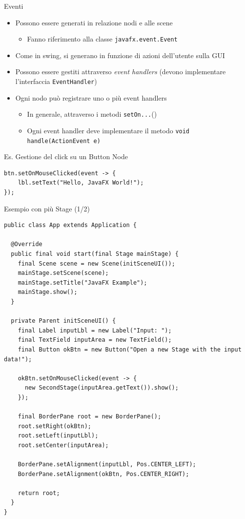 \documentclass[xcolor=dvipsnames,presentation]{beamer}
\begin{document}
\begin{frame}[fragile]{Eventi}
\begin{itemize}\itemsep10pt
\item Possono essere generati in relazione nodi e alle scene
\begin{itemize}
\item Fanno riferimento alla classe \texttt{javafx.event.Event}
\end{itemize}
\item Come in swing, si generano in funzione di azioni dell'utente sulla GUI
\item Possono essere gestiti attraverso \emph{event handlers} (devono implementare l'interfaccia \texttt{EventHandler})
\item Ogni nodo può registrare uno o più event handlers
\begin{itemize}
\item In generale, attraverso i metodi \texttt{setOn...}()
\item Ogni event handler deve implementare il metodo \texttt{void handle(ActionEvent e)}
\end{itemize}
\end{itemize}

\begin{block}{Es. Gestione del click su un Button Node}
\begin{lstlisting}
btn.setOnMouseClicked(event -> {
    lbl.setText("Hello, JavaFX World!");
});
\end{lstlisting}
\end{block}
\end{frame}

\begin{frame}[fragile]{Esempio con più Stage (1/2)}
\begin{lstlisting}[basicstyle=\tiny\ttfamily]
public class App extends Application {

  @Override
  public final void start(final Stage mainStage) {
    final Scene scene = new Scene(initSceneUI());
    mainStage.setScene(scene);
    mainStage.setTitle("JavaFX Example");
    mainStage.show();
  }

  private Parent initSceneUI() {
    final Label inputLbl = new Label("Input: ");
    final TextField inputArea = new TextField();
    final Button okBtn = new Button("Open a new Stage with the input data!");

    okBtn.setOnMouseClicked(event -> {
      new SecondStage(inputArea.getText()).show();
    });

    final BorderPane root = new BorderPane();
    root.setRight(okBtn);
    root.setLeft(inputLbl);
    root.setCenter(inputArea);

    BorderPane.setAlignment(inputLbl, Pos.CENTER_LEFT);
    BorderPane.setAlignment(okBtn, Pos.CENTER_RIGHT);

    return root;
  }
}
\end{lstlisting}
\end{frame}
\end{document}
